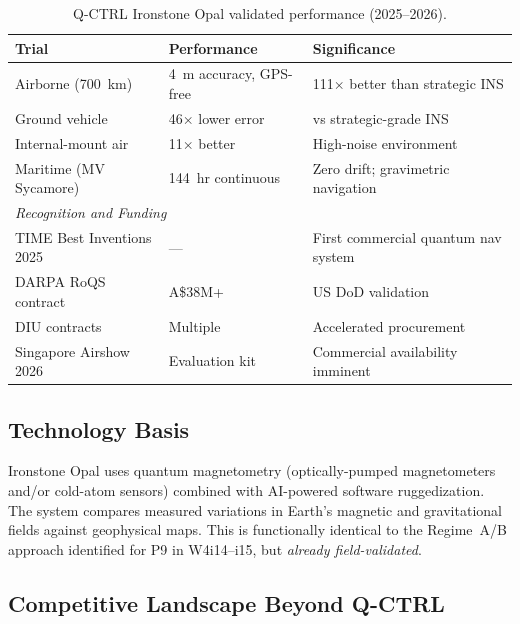 \documentclass[11pt]{article}
\theoremstyle{definition}
\theoremstyle{remark}
\begin{document}
\begin{table}[H]
\centering
\caption{Q-CTRL Ironstone Opal validated performance (2025--2026).}
\label{tab:qctrl-performance}
\begin{tabular}{@{}p{3.5cm}p{4cm}p{5cm}@{}}
\toprule
Trial & Performance & Significance \\
\midrule
Airborne (700~km) & 4~m accuracy, GPS-free & 111$\times$ better than strategic INS \\
Ground vehicle & 46$\times$ lower error & vs strategic-grade INS \\
Internal-mount air & 11$\times$ better & High-noise environment \\
Maritime (MV Sycamore) & 144~hr continuous & Zero drift; gravimetric navigation \\
\midrule
\multicolumn{3}{l}{\textit{Recognition and Funding}} \\
TIME Best Inventions 2025 & --- & First commercial quantum nav system \\
DARPA RoQS contract & A\$38M+ & US DoD validation \\
DIU contracts & Multiple & Accelerated procurement \\
Singapore Airshow 2026 & Evaluation kit & Commercial availability imminent \\
\bottomrule
\end{tabular}
\end{table}

\subsection{Technology Basis}

Ironstone Opal uses quantum magnetometry (optically-pumped magnetometers
and/or cold-atom sensors) combined with AI-powered software ruggedization.
The system compares measured variations in Earth's magnetic and gravitational
fields against geophysical maps. This is functionally identical to the
Regime~A/B approach identified for P9 in W4i14--i15, but \emph{already
field-validated}.

\subsection{Competitive Landscape Beyond Q-CTRL}
\end{document}
